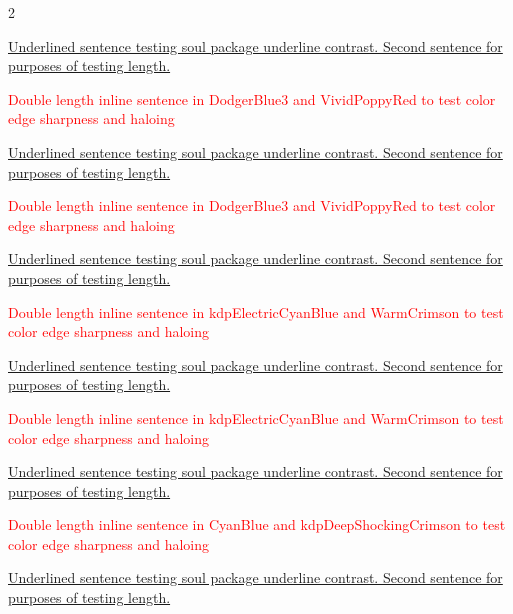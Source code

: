 \begin{multicols}{2}
\clearpage
{}
\par\noindent\ul{Underlined sentence testing soul package underline contrast. Second sentence for purposes of testing length.}
\par\noindent\textcolor{Red}{Double length inline sentence in DodgerBlue3 and VividPoppyRed to test color edge sharpness and haloing}
\clearpage
{}
\par\noindent\ul{Underlined sentence testing soul package underline contrast. Second sentence for purposes of testing length.}
\par\noindent\textcolor{Red}{Double length inline sentence in DodgerBlue3 and VividPoppyRed to test color edge sharpness and haloing}
\clearpage
{}
\par\noindent\ul{Underlined sentence testing soul package underline contrast. Second sentence for purposes of testing length.}
\par\noindent\textcolor{Red}{Double length inline sentence in kdpElectricCyanBlue and WarmCrimson to test color edge sharpness and haloing}
\clearpage
{}
\par\noindent\ul{Underlined sentence testing soul package underline contrast. Second sentence for purposes of testing length.}
\par\noindent\textcolor{Red}{Double length inline sentence in kdpElectricCyanBlue and WarmCrimson to test color edge sharpness and haloing}
\clearpage
{}
\par\noindent\ul{Underlined sentence testing soul package underline contrast. Second sentence for purposes of testing length.}
\par\noindent\textcolor{Red}{Double length inline sentence in CyanBlue and kdpDeepShockingCrimson to test color edge sharpness and haloing}
\clearpage
{}
\par\noindent\ul{Underlined sentence testing soul package underline contrast. Second sentence for purposes of testing length.}

\end{multicols}
